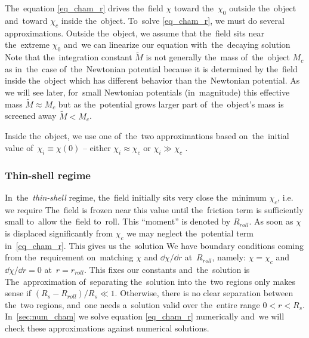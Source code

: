 {The~equation \eqref{eq_cham_r} drives the~field $\chi$ toward the~$\chi_0$ outside the~object and~toward $\chi_c$ inside the~object. To~solve \eqref{eq_cham_r}, we must do several approximations. Outside the~object, we assume that the~field sits near the~extreme $\chi_0$ and~we can linearize our equation
with~the~decaying solution
Note that the~integration constant $\tilde{M}$ is not generally the~mass of~the~object $M_c$ as in~the~case of~the~Newtonian potential because it is determined by the~field inside the~object which has different behavior than the~Newtonian potential. As we will see later, for~small Newtonian potentials (in~magnitude) this effective mass $\tilde{M}\approx M_c$ but as the~potential grows larger part of~the~object's mass is screened away $\tilde{M}< M_c$.

Inside the~object, we use one of~the~two approximations based on~the~initial value of~$\chi_i\equiv\chi(0)$ -- either $\chi_i\approx\chi_c$ or $\chi_i\gg\chi_c$ .
\subsubsection{Thin-shell regime}
In~the~\textit{thin-shell} regime, the~field initially sits very close the~minimum $\chi_c$, i.e. we require
The~field is frozen near this value until the~friction term is sufficiently small to~allow the~field to~roll. This ``moment'' is denoted by $R_{roll}$. As soon as $\chi$ is displaced significantly from $\chi_c$ we may neglect the~potential term in~\eqref{eq_cham_r}. This gives us the~solution
We have boundary conditions coming from the~requirement on~matching $\chi$ and $\dd\chi/\dd r$ at~$R_{roll}$, namely: $\chi=\chi_c$ and~$\dd\chi/\dd r=0$ at~$r=r_{roll}$. This fixes our constants and~the~solution is
The~approximation of~separating the~solution into the~two regions only makes sense if $(R_s-R_{roll})/R_s\ll1$. Otherwise, there is no clear separation between the~two regions, and~one needs a~solution valid over the~entire range $0<r<R_s$. In~\autoref{sec:num_cham} we solve equation \eqref{eq_cham_r} numerically and~we will check these approximations against numerical solutions.

}
